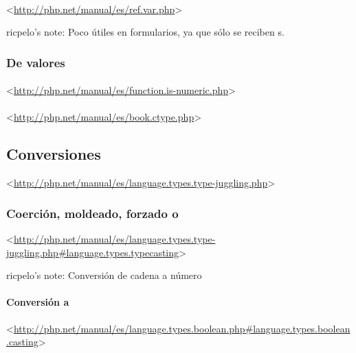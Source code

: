\documentclass[a4paper,11pt,spanish]{sphinxmanual}
\begin{document}
\paragraph{}
\label{\detokenize{php:is}}
\textless{}\url{http://php.net/manual/es/ref.var.php}\textgreater{}

ricpelo's note: Poco útiles en formularios, ya que sólo se reciben
s.


\subsubsection{De valores}
\label{\detokenize{php:de-valores}}

\paragraph{}
\label{\detokenize{php:is-numeric}}
\textless{}\url{http://php.net/manual/es/function.is-numeric.php}\textgreater{}


\paragraph{}
\label{\detokenize{php:ctype}}
\textless{}\url{http://php.net/manual/es/book.ctype.php}\textgreater{}


\subsection{Conversiones}
\label{\detokenize{php:conversiones}}
\textless{}\url{http://php.net/manual/es/language.types.type-juggling.php}\textgreater{}


\subsubsection{Coerción, moldeado, forzado o }
\label{\detokenize{php:coercion-moldeado-forzado-o-casting}}
\textless{}\url{http://php.net/manual/es/language.types.type-juggling.php\#language.types.typecasting}\textgreater{}

ricpelo's note: Conversión de cadena a número


\paragraph{Conversión a }
\label{\detokenize{php:conversion-a-bool}}
\textless{}\url{http://php.net/manual/es/language.types.boolean.php\#language.types.boolean.casting}\textgreater{}
\end{document}

